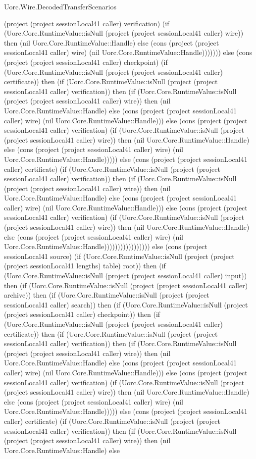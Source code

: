 \begin{lexlean}{Uorc.Wire.DecodedTransferScenarios}
\begin{semanticmodule}
{(project (project sessionLocal41 caller) verification) (if (Uorc.Core.RuntimeValue::isNull (project (project sessionLocal41 caller) wire)) then (nil Uorc.Core.RuntimeValue::Handle) else (cons (project (project sessionLocal41 caller) wire) (nil Uorc.Core.RuntimeValue::Handle))))))) else (cons (project (project sessionLocal41 caller) checkpoint) (if (Uorc.Core.RuntimeValue::isNull (project (project sessionLocal41 caller) certificate)) then (if (Uorc.Core.RuntimeValue::isNull (project (project sessionLocal41 caller) verification)) then (if (Uorc.Core.RuntimeValue::isNull (project (project sessionLocal41 caller) wire)) then (nil Uorc.Core.RuntimeValue::Handle) else (cons (project (project sessionLocal41 caller) wire) (nil Uorc.Core.RuntimeValue::Handle))) else (cons (project (project sessionLocal41 caller) verification) (if (Uorc.Core.RuntimeValue::isNull (project (project sessionLocal41 caller) wire)) then (nil Uorc.Core.RuntimeValue::Handle) else (cons (project (project sessionLocal41 caller) wire) (nil Uorc.Core.RuntimeValue::Handle))))) else (cons (project (project sessionLocal41 caller) certificate) (if (Uorc.Core.RuntimeValue::isNull (project (project sessionLocal41 caller) verification)) then (if (Uorc.Core.RuntimeValue::isNull (project (project sessionLocal41 caller) wire)) then (nil Uorc.Core.RuntimeValue::Handle) else (cons (project (project sessionLocal41 caller) wire) (nil Uorc.Core.RuntimeValue::Handle))) else (cons (project (project sessionLocal41 caller) verification) (if (Uorc.Core.RuntimeValue::isNull (project (project sessionLocal41 caller) wire)) then (nil Uorc.Core.RuntimeValue::Handle) else (cons (project (project sessionLocal41 caller) wire) (nil Uorc.Core.RuntimeValue::Handle))))))))))))))))) else (cons (project sessionLocal41 source) (if (Uorc.Core.RuntimeValue::isNull (project (project (project sessionLocal41 lengths) table) root)) then (if (Uorc.Core.RuntimeValue::isNull (project (project sessionLocal41 caller) input)) then (if (Uorc.Core.RuntimeValue::isNull (project (project sessionLocal41 caller) archive)) then (if (Uorc.Core.RuntimeValue::isNull (project (project sessionLocal41 caller) search)) then (if (Uorc.Core.RuntimeValue::isNull (project (project sessionLocal41 caller) checkpoint)) then (if (Uorc.Core.RuntimeValue::isNull (project (project sessionLocal41 caller) certificate)) then (if (Uorc.Core.RuntimeValue::isNull (project (project sessionLocal41 caller) verification)) then (if (Uorc.Core.RuntimeValue::isNull (project (project sessionLocal41 caller) wire)) then (nil Uorc.Core.RuntimeValue::Handle) else (cons (project (project sessionLocal41 caller) wire) (nil Uorc.Core.RuntimeValue::Handle))) else (cons (project (project sessionLocal41 caller) verification) (if (Uorc.Core.RuntimeValue::isNull (project (project sessionLocal41 caller) wire)) then (nil Uorc.Core.RuntimeValue::Handle) else (cons (project (project sessionLocal41 caller) wire) (nil Uorc.Core.RuntimeValue::Handle))))) else (cons (project (project sessionLocal41 caller) certificate) (if (Uorc.Core.RuntimeValue::isNull (project (project sessionLocal41 caller) verification)) then (if (Uorc.Core.RuntimeValue::isNull (project (project sessionLocal41 caller) wire)) then (nil Uorc.Core.RuntimeValue::Handle) else }
\end{semanticmodule}
\end{lexlean}
